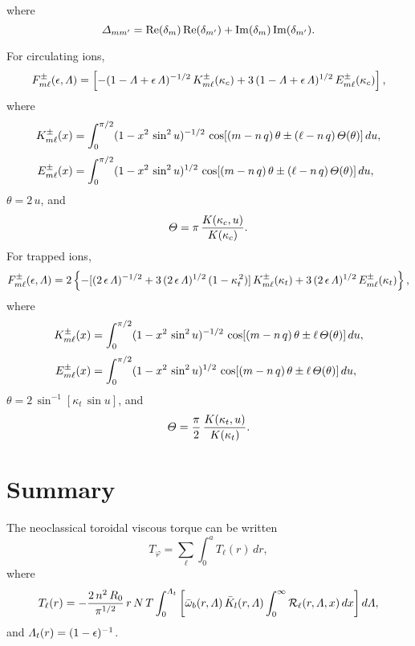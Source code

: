\documentclass[12pt,prb,aps,notitlepage]{revtex4-1}
\begin{document}
where
\begin{equation}
{\mit\Delta}_{mm'} = {\rm Re}(\delta_m)\,{\rm Re}(\delta_{m'})+ {\rm Im}(\delta_m)\,{\rm Im}(\delta_{m'}).
\end{equation}

For circulating ions,
\begin{align}
F_{m\ell}^\pm(\epsilon,{\mit\Lambda}) = \left[-(1-{\mit\Lambda}+\epsilon\,{\mit\Lambda})^{-1/2}\,K^\pm_{m\ell}(\kappa_c) + 3\,(1-{\mit\Lambda}+\epsilon\,{\mit\Lambda})^{1/2}\,
E^\pm_{m\ell}(\kappa_c)\right],
\end{align}
where
\begin{align}
K^\pm_{m\ell}(x) &= \int_0^{\pi/2} (1-x^2\,\sin^2 u)^{-1/2}\,\cos[(m-n\,q)\,\theta \pm (\ell -n\,q)\,{\mit\Theta}(\theta)]\,du,\\[0.5ex]
E^\pm_{m\ell}(x) &= \int_0^{\pi/2} (1-x^2\,\sin^2 u)^{1/2}\,\cos[(m-n\,q)\,\theta \pm (\ell -n\,q)\,{\mit\Theta}(\theta)]\,du,
\end{align}
 $\theta=2\,u$, and
 \begin{equation}
 {\mit\Theta} = \pi\,\frac{K(\kappa_c,u)}{K(\kappa_c)}.
 \end{equation}
 For trapped ions,
\begin{align}
F_{m\ell}^\pm(\epsilon,{\mit\Lambda}) = 2\left\{-[(2\,\epsilon\,{\mit\Lambda})^{-1/2}+3\,(2\,\epsilon\,{\mit\Lambda})^{1/2}\,(1-\kappa_t^{\,2})]\,K^\pm_{m\ell}(\kappa_t) + 3\,(2\,\epsilon\,{\mit\Lambda})^{1/2}\,E^\pm_{m\ell}(\kappa_t)\right\},
\end{align}
where 
\begin{align}
K^\pm_{m\ell}(x) &= \int_0^{\pi/2} (1-x^2\,\sin^2 u)^{-1/2}\,\cos[(m-n\,q)\,\theta \pm \ell\,{\mit\Theta}(\theta)]\,du,\\[0.5ex]
E^\pm_{m\ell}(x) &= \int_0^{\pi/2} (1-x^2\,\sin^2 u)^{1/2}\,\cos[(m-n\,q)\,\theta \pm \ell \,{\mit\Theta}(\theta)]\,du,
\end{align}
 $\theta=2\,\sin^{-1}[\kappa_t\,\sin u]$, and
\begin{equation}
{\mit\Theta}= \frac{\pi}{2}\,\frac{K(\kappa_t,u)}{K(\kappa_t)}.
\end{equation}

\section{Summary}
The neoclassical toroidal viscous torque can be written
\begin{equation}
T_\varphi = \sum_{\ell} \int_0^a T_\ell(r)\,dr,
\end{equation}
where
\begin{equation}
T_\ell(r) = -\frac{2\,n^2\,R_0}{\pi^{1/2}}\,r\,N\,T\int_0^{{\mit\Lambda}_t}\left[\bar{\omega}_b(r,{\mit\Lambda})\,\bar{K}_l(r,{\mit\Lambda})\int_0^\infty {\cal R}_\ell(r,{\mit\Lambda},x)\,dx\right]d{\mit\Lambda}, 
\end{equation}
and ${\mit\Lambda}_t(r)=(1-\epsilon)^{-1}$. 
\end{document}
